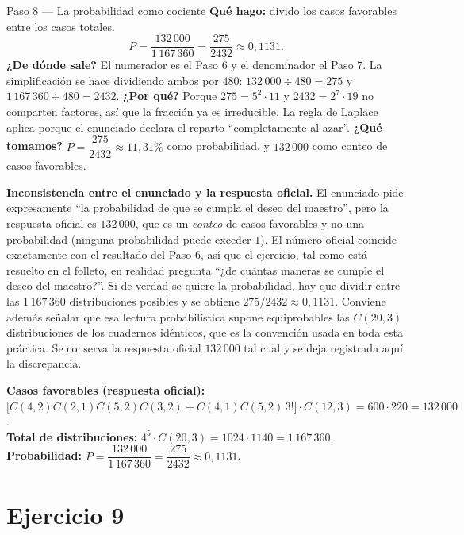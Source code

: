 \documentclass[11pt]{article}
\begin{document}
\begin{paso}{Paso 8 --- La probabilidad como cociente}
\textbf{Qué hago:} divido los casos favorables entre los casos totales.
\[
P=\frac{132\,000}{1\,167\,360}=\frac{275}{2432}\approx 0{,}1131 .
\]
\textbf{¿De dónde sale?} El numerador es el Paso 6 y el denominador el Paso 7. La simplificación se hace dividiendo ambos por $480$: $132\,000\div480=275$ y $1\,167\,360\div480=2432$.
\textbf{¿Por qué?} Porque $275=5^2\cdot 11$ y $2432=2^7\cdot 19$ no comparten factores, así que la fracción ya es irreducible. La regla de Laplace aplica porque el enunciado declara el reparto ``completamente al azar''.
\textbf{¿Qué tomamos?} $P=\dfrac{275}{2432}\approx 11{,}31\%$ como probabilidad, y $132\,000$ como conteo de casos favorables.
\end{paso}

\begin{nota}
\textbf{Inconsistencia entre el enunciado y la respuesta oficial.} El enunciado pide expresamente ``la probabilidad de que se cumpla el deseo del maestro'', pero la respuesta oficial es $132\,000$, que es un \emph{conteo} de casos favorables y no una probabilidad (ninguna probabilidad puede exceder $1$). El número oficial coincide exactamente con el resultado del Paso 6, así que el ejercicio, tal como está resuelto en el folleto, en realidad pregunta ``¿de cuántas maneras se cumple el deseo del maestro?''. Si de verdad se quiere la probabilidad, hay que dividir entre las $1\,167\,360$ distribuciones posibles y se obtiene $275/2432\approx 0{,}1131$. Conviene además señalar que esa lectura probabilística supone equiprobables las $C(20,3)$ distribuciones de los cuadernos idénticos, que es la convención usada en toda esta práctica. Se conserva la respuesta oficial $132\,000$ tal cual y se deja registrada aquí la discrepancia.
\end{nota}

\begin{resp}
\textbf{Casos favorables (respuesta oficial):}
$\bigl[C(4,2)C(2,1)C(5,2)C(3,2)+C(4,1)C(5,2)\,3!\bigr]\cdot C(12,3)=600\cdot 220=132\,000$.\\
\textbf{Total de distribuciones:} $4^5\cdot C(20,3)=1024\cdot 1140=1\,167\,360$.\\
\textbf{Probabilidad:} $P=\dfrac{132\,000}{1\,167\,360}=\dfrac{275}{2432}\approx 0{,}1131$.
\end{resp}

\section*{Ejercicio 9}
\end{document}
